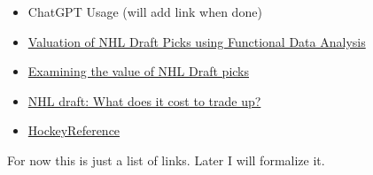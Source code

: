 \documentclass[
  letterpaper,
  DIV=11,
  numbers=noendperiod]{scrreprt}
\newlength{\cslhangindent}
\newenvironment{CSLReferences}[2] %
 {\begin{list}{}{%
  \setlength{\itemindent}{0pt}
  \setlength{\leftmargin}{0pt}
  \setlength{\parsep}{0pt}
  \ifodd #1
   \setlength{\leftmargin}{\cslhangindent}
   \setlength{\itemindent}{-1\cslhangindent}
  \fi
  \setlength{\itemsep}{#2\baselineskip}}}
 {\end{list}}
\begin{document}
\label{refs}
\begin{CSLReferences}{0}{1}
\begin{itemize}
\item
  ChatGPT Usage (will add link when done)
\item
  \href{https://summit.sfu.ca/_flysystem/fedora/2023-02/etd22223.pdf}{Valuation
  of NHL Draft Picks using Functional Data Analysis}
\item
  \href{https://soundofhockey.com/2022/06/06/examining-the-value-of-nhl-draft-picks/amp/}{Examining
  the value of NHL Draft picks}
\item
  \href{https://www.broadstreethockey.com/post/nhl-draft-pick-value-trading-up/}{NHL
  draft: What does it cost to trade up?}
\item
  \href{https://www.hockey-reference.com/draft/}{HockeyReference}
\end{itemize}

\end{CSLReferences}

For now this is just a list of links. Later I will formalize it.
\end{document}
